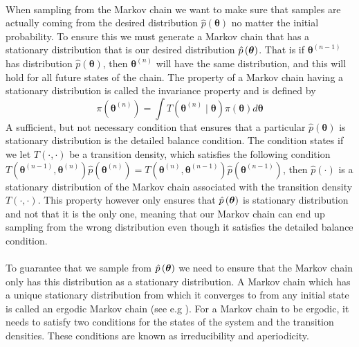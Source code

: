 \\
When sampling from the Markov chain we want to make sure that samples are actually coming from the desired distribution $\hat{p}(\boldsymbol{\theta})$ no matter the initial probability. To ensure this we must generate a Markov chain that has a stationary distribution that is our desired distribution $\hat{p}\left (\boldsymbol{\theta}\right)$. That is if $\boldsymbol{\theta}^{(n-1)}$ has distribution $\hat{p}(\boldsymbol{\theta})$, then  $\boldsymbol{\theta}^{(n)}$ will have the same distribution, and this will hold for all future states of the chain. The property of a Markov chain having a stationary distribution is called the invariance property and is defined by
\begin{equation*}
    \pi(\boldsymbol{\theta}^{(n)})=\int T(\boldsymbol{\theta}^{(n)}\mid \boldsymbol{\theta}) \pi(\boldsymbol{\theta})d\boldsymbol{\theta}
\end{equation*}
A sufficient, but not necessary condition that ensures that a particular $\hat{p}(\boldsymbol{\theta})$ is stationary distribution is the detailed balance condition. The condition states if we let $T(\cdot,\cdot)$ be a transition density, which satisfies the following condition $T(\boldsymbol{\theta}^{(n-1)}, \boldsymbol{\theta}^{(n)}) \hat{p}(\boldsymbol{\theta}^{(n)})= T(\boldsymbol{\theta}^{(n)}, \boldsymbol{\theta}^{(n-1)})\hat{p}(\boldsymbol{\theta}^{(n-1)})$, then $\hat{p}(\cdot)$ is a stationary distribution of the Markov chain associated with the transition density $T(\cdot,\cdot)$. This property however only ensures that $\hat{p}\left (\boldsymbol{\theta}\right)$ is stationary distribution and not that it is the only one, meaning that our Markov chain can end up sampling from the wrong distribution even though it satisfies the detailed balance condition.
\\
\\
To guarantee that we sample from $\hat{p} \left (\boldsymbol{\theta}\right)$ we need to ensure that the Markov chain only has this distribution as a stationary distribution. A Markov chain which has a unique stationary distribution from which it converges to from any initial state is called an ergodic Markov chain (see e.g \cite{turkman2019computational}). For a Markov chain to be ergodic, it needs to satisfy two conditions for the states of the system and the transition densities. These conditions are known as irreducibility and aperiodicity. 
\\
\\
